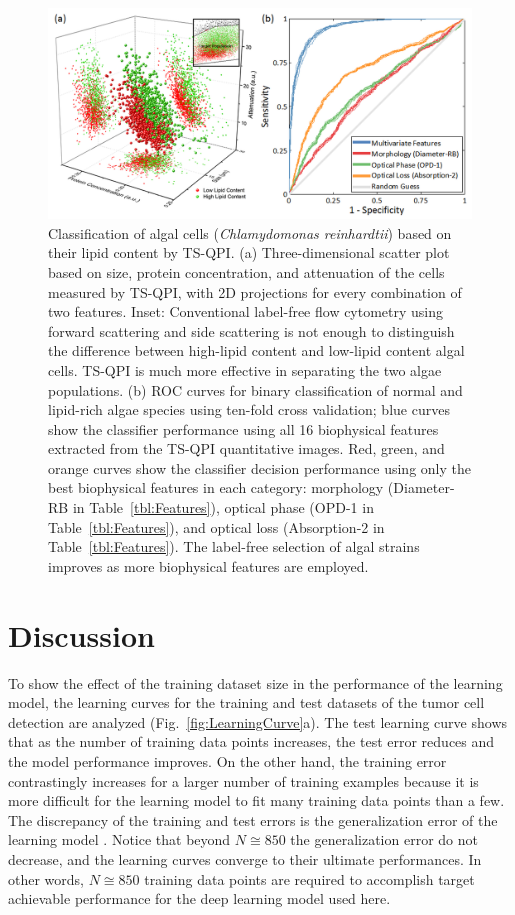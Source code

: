 \documentclass[aps,pra,reprint,superscriptaddress]{revtex4-1}
\begin{document}
\begin{figure}
\includegraphics[scale=0.8]{FigureAlgae.jpg}
\caption{\label{fig:AlgaeScatter} Classification of algal cells (\textit{Chlamydomonas reinhardtii}) based on their lipid content by TS-QPI. (a) Three-dimensional scatter plot based on size, protein concentration, and attenuation of the cells measured by TS-QPI, with 2D projections for every combination of two features. Inset: Conventional label-free flow cytometry using forward scattering and side scattering is not enough to distinguish the difference between high-lipid content and low-lipid content algal cells. TS-QPI is much more effective in separating the two algae populations. (b) ROC curves for binary classification of normal and lipid-rich algae species using ten-fold cross validation; blue curves show the classifier performance using all 16 biophysical features extracted from the TS-QPI quantitative images. Red, green, and orange curves show the classifier decision performance using only the best biophysical features in each category: morphology (Diameter-RB in Table~\ref{tbl:Features}), optical phase (OPD-1 in Table~\ref{tbl:Features}), and optical loss (Absorption-2 in Table~\ref{tbl:Features}). The label-free selection of algal strains improves as more biophysical features are employed.}
\end{figure}

\section*{Discussion}

To show the effect of the training dataset size in the performance of the learning model, the learning curves for the training and test datasets of the tumor cell detection are analyzed (Fig.~\ref{fig:LearningCurve}a). The test learning curve shows that as the number of training data points increases, the test error reduces and the model performance improves. On the other hand, the training error contrastingly increases for a larger number of training examples because it is more difficult for the learning model to fit many training data points than a few. The discrepancy of the training and test errors is the generalization error of the learning model \cite{abu2012learning}. Notice that beyond $N \cong 850$ the generalization error do not decrease, and the learning curves converge to their ultimate performances. In other words, $N \cong 850$ training data points are required to accomplish target achievable performance for the deep learning model used here.
\end{document}
